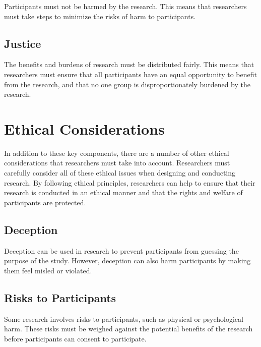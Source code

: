 \documentclass[
  b5paper]{book}
\begin{document}
Participants must not be harmed by the research. This means that researchers must take steps to minimize the risks of harm to participants.

\hypertarget{justice}{%
\subsection*{Justice}\label{justice}}

The benefits and burdens of research must be distributed fairly. This means that researchers must ensure that all participants have an equal opportunity to benefit from the research, and that no one group is disproportionately burdened by the research.

\hypertarget{ethical-considerations}{%
\section{Ethical Considerations}\label{ethical-considerations}}

In addition to these key components, there are a number of other ethical considerations that researchers must take into account. Researchers must carefully consider all of these ethical issues when designing and conducting research. By following ethical principles, researchers can help to ensure that their research is conducted in an ethical manner and that the rights and welfare of participants are protected.

\hypertarget{deception}{%
\subsection*{Deception}\label{deception}}

Deception can be used in research to prevent participants from guessing the purpose of the study. However, deception can also harm participants by making them feel misled or violated.

\hypertarget{risks-to-participants}{%
\subsection*{Risks to Participants}\label{risks-to-participants}}

Some research involves risks to participants, such as physical or psychological harm. These risks must be weighed against the potential benefits of the research before participants can consent to participate.
\end{document}
